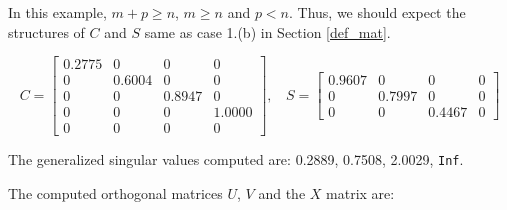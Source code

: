 \begin{enumerate}[(1).]
            In this example, $m + p \geq n$, $m \geq n$ and $p < n$. Thus, we should expect the structures of $C$ and $S$ same as case 1.(b) in Section \ref{def_mat}. 
        
            \begin{equation*}
                C = \begin{bmatrix}
                    0.2775  &       0  &       0    &     0 \\
                         0  &  0.6004  &       0    &     0 \\
                         0  &       0  &  0.8947    &     0 \\
                         0  &       0  &       0    & 1.0000 \\
                         0  &       0  &       0    &     0
                \end{bmatrix}, \ \ \ \
                S = \begin{bmatrix}
                    0.9607 &        0 &        0    &  0 \\
                         0 &   0.7997 &        0    &  0 \\
                         0 &        0 &   0.4467    &  0 
                \end{bmatrix}
            \end{equation*}
    
            The generalized singular values computed are: 0.2889, 0.7508, 2.0029, \texttt{Inf}. 
            
            The computed orthogonal matrices $U$, $V$ and the $X$ matrix are:
    

\end{enumerate}
